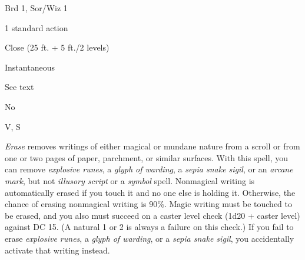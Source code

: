 
\begin{description*}
\item[Level:] Brd 1, Sor/Wiz 1
\item[Casting Time:] 1 standard action
\item[Range:] Close (25 ft. + 5 ft./2 levels)
\item[Duration:] Instantaneous
\item[Saving Throw:] See text
\item[Spell Resistance:] No
\item[Components:] V, S
\end{description*}

\textit{Erase} removes writings of either magical or mundane nature from a scroll
or from one or two pages of paper, parchment, or similar surfaces. With this spell,
you can remove \textit{explosive runes}, a \textit{glyph of warding}, a \textit{sepia
snake sigil}, or an \textit{arcane mark}, but not \textit{illusory script} or a
\textit{symbol} spell. Nonmagical writing is automatically erased if you touch
it and no one else is holding it. Otherwise, the chance of erasing nonmagical writing
is 90\%.
Magic writing must be touched to be erased, and you also must succeed on a caster
level check (1d20 + caster level) against DC 15. (A natural 1 or 2 is always a
failure on this check.) If you fail to erase \textit{explosive runes}, a \textit{glyph
of warding}, or a \textit{sepia snake sigil}, you accidentally activate that writing
instead.